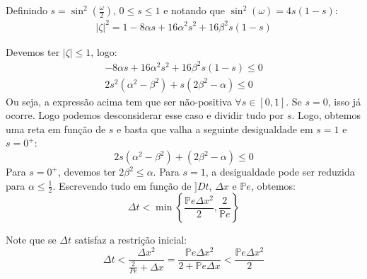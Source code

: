 \documentclass[12pt, a4paper]{article}
\newcommand{\bb}[1]{\mathbb{#1}}
\newcommand{\D}[1]{\Delta#1}
\newcommand{\Pe}{\bb{P}e}
\begin{document}
    Definindo $s = \sin^2\left( \frac{\omega}{2} \right)$, $0 \le s \le 1$ e notando que $\sin^2(\omega) = 4s(1-s)$:
    \begin{equation}
        \begin{split}
            |\zeta|^2 = 1-8\alpha s + 16\alpha^2 s^2 + 16\beta^2 s(1-s)
        \end{split}
    \end{equation}

    Devemos ter $|\zeta| \le 1$, logo:
    \begin{equation}
        \begin{split}
            -8\alpha s + 16\alpha^2 s^2 + 16\beta^2 s(1-s) \le 0 \\
            2s^2 (\alpha^2 - \beta^2) + s(2\beta^2 - \alpha) \le 0
        \end{split}
    \end{equation}
    Ou seja, a expressão acima tem que ser não-positiva $\forall s \in [0,1]$. Se $s=0$, isso já ocorre. Logo podemos desconsiderar esse caso e dividir tudo por $s$. Logo, obtemos uma reta em função de $s$ e basta que valha a seguinte desigualdade em $s=1$ e $s=0^+$:
    \[
        2s (\alpha^2 - \beta^2) + (2\beta^2 - \alpha) \le 0
    \]
    Para $s=0^+$, devemos ter $2\beta^2 \le \alpha$. Para $s=1$, a desigualdade pode ser reduzida para $\alpha \le \frac{1}{2}$. Escrevendo tudo em função de $]D{t}$, $\D{x}$ e $\Pe$, obtemos:
    \begin{equation}
        \D{t} < \min\left\{\frac{\Pe\D{x^2}}{2}, \frac{2}{\Pe} \right\}
    \end{equation}

    Note que se $\D{t}$ satisfaz a restrição inicial:
    \[
        \Delta t < \frac{\Delta x^2}{\frac{2}{Pe} + \Delta x} = \frac{\Pe \D{x^2}}{2 + \Pe \D{x}} < \frac{\Pe \D{x^2}}{2}
    \]
\end{document}
